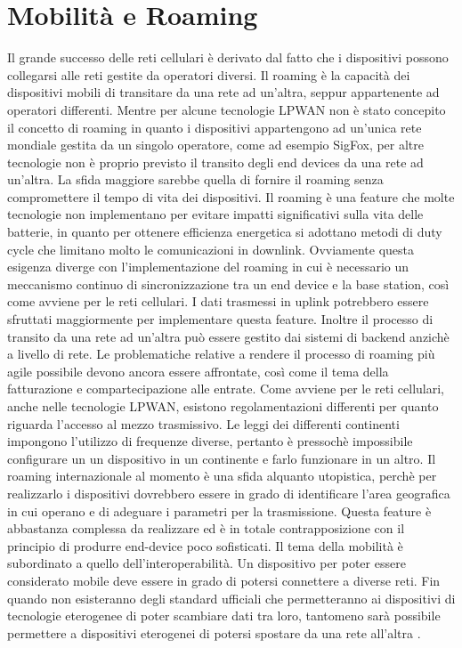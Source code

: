 \documentclass[12pt,a4paper,openright,twoside]{report}
\begin{document}
\section{Mobilit\`a e Roaming }
Il grande successo delle reti cellulari \`e derivato dal fatto che i dispositivi possono collegarsi alle reti gestite da operatori diversi. Il roaming \`e la capacit\`a dei dispositivi mobili di transitare da una rete ad un'altra, seppur appartenente ad operatori differenti. 
Mentre per alcune tecnologie LPWAN non \`e stato concepito il concetto di roaming in quanto i dispositivi appartengono ad un'unica rete mondiale gestita da un singolo operatore, come ad esempio SigFox, per altre tecnologie non \`e proprio previsto il transito degli end devices da una rete ad un'altra.  
La sfida maggiore sarebbe quella di fornire il roaming senza compromettere il tempo di vita dei dispositivi. Il roaming \`e una feature che molte tecnologie non implementano per evitare impatti significativi sulla vita delle batterie, in quanto per ottenere efficienza energetica si adottano metodi di duty cycle che limitano molto le comunicazioni in downlink. 
Ovviamente questa esigenza diverge con l'implementazione del roaming in cui \`e necessario un meccanismo continuo di sincronizzazione tra un end device e la base station, cos\`i come avviene per le reti cellulari. 
I dati trasmessi in uplink potrebbero essere sfruttati maggiormente per implementare questa feature. Inoltre il processo di transito da una rete ad un'altra pu\`o essere gestito dai sistemi di backend anzich\`e a livello di rete. Le problematiche relative a rendere il processo di roaming pi\`u agile possibile devono ancora essere affrontate, cos\`i come il tema della fatturazione e compartecipazione alle entrate. 
Come avviene per le reti cellulari, anche nelle tecnologie LPWAN, esistono regolamentazioni differenti per quanto riguarda l'accesso al mezzo trasmissivo. Le leggi dei differenti continenti impongono l'utilizzo di frequenze diverse, pertanto \`e pressoch\`e impossibile configurare un un dispositivo in un continente e farlo funzionare in un altro. Il roaming internazionale al momento \`e una sfida alquanto utopistica, perch\`e per realizzarlo i dispositivi dovrebbero essere in grado di identificare l'area geografica in cui operano e di adeguare i parametri per la trasmissione. Questa feature \`e abbastanza complessa da realizzare ed \`e in totale contrapposizione con il principio di produrre end-device poco sofisticati.        
Il tema della mobilit\`a \`e subordinato a quello dell'interoperabilit\`a. Un dispositivo per poter essere considerato mobile deve essere in grado di potersi connettere a diverse reti. 
Fin quando non esisteranno degli standard ufficiali che permetteranno ai dispositivi di tecnologie eterogenee di poter scambiare dati tra loro, tantomeno sar\`a possibile permettere a dispositivi eterogenei di potersi spostare da una rete all'altra \cite{K2}.     	
\end{document}
